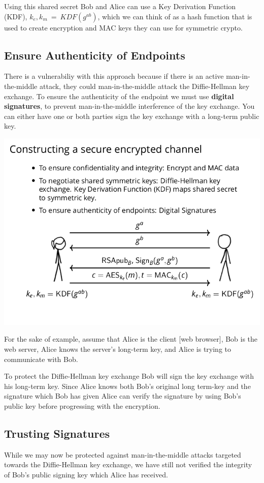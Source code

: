 \documentclass[11pt]{article} %
\begin{document}
\bigskip
{\parindent0pt Using this shared secret Bob and Alice can use a Key Derivation
Function (KDF), 
\smallskip
$k_e, k_m\ =\ KDF(g^{ab})$, which we can think of as a hash function that is 
used to create encryption and MAC keys they can use for symmetric crypto.

\newpage
\subsection{Ensure Authenticity of Endpoints}
There is a vulnerabiliy with this approach because if there is an active
man-in-the-middle attack, they could man-in-the-middle attack the Diffie-Hellman
key exchange.  To ensure the authenticity of the endpoint we must use
\textbf{digital signatures}, to prevent man-in-the-middle interference of the
key exchange.
\smallskip
You can either have one or both parties sign the key exchange with a long-term
public key.

\includegraphics[scale=.7]{./tls3.png}

For the sake of example, assume that Alice is the client [web browser], Bob is 
the web server, Alice knows the server's long-term key, and Alice is trying to
communicate with Bob.

\bigskip
To protect the Diffie-Hellman key exchange Bob will sign the key exchange with 
his long-term key.  Since Alice knows both Bob's original long term-key and the
signature which Bob has given Alice can verify the signature by using Bob's
public key before progressing with the encryption.

\newpage
\subsection{Trusting Signatures}
While we may now be protected against man-in-the-middle attacks targeted towards
the Diffie-Hellman key exchange, we have still not verified the integrity of
Bob's public signing key which Alice has received.

}
\end{document}

